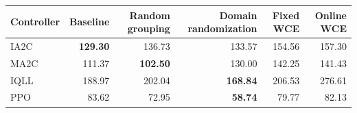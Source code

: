 \begin{tabular}{lrrrrr}
\hline
Controller & Baseline & Random grouping & Domain randomization & Fixed WCE & Online WCE \\
\hline
IA2C & \textbf{129.30} & 136.73 & 133.57 & 154.56 & 157.30 \\
MA2C & 111.37 & \textbf{102.50} & 130.00 & 142.25 & 141.43 \\
IQLL & 188.97 & 202.04 & \textbf{168.84} & 206.53 & 276.61 \\
PPO & 83.62 & 72.95 & \textbf{58.74} & 79.77 & 82.13 \\
\hline
\end{tabular}
